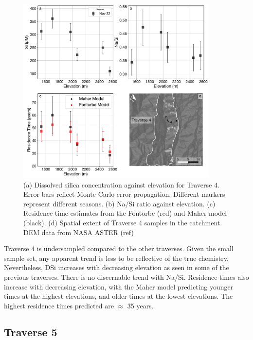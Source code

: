 \begin{figure}[h]
    \centering
        \includegraphics[width=0.9\textwidth]{Traverse_4_summary.pdf}
    \caption{(a) Dissolved silica concentration against elevation for Traverse 4. Error bars reflect Monte Carlo error propagation. Different markers represent different seasons. (b) Na/Si ratio against elevation. (c) Residence time estimates from the Fontorbe (red) and Maher model (black). (d) Spatial extent of Traverse 4 samples in the catchment. DEM data from NASA ASTER (ref)}
    \label{fig:trav4}
\end{figure}

\FloatBarrier

Traverse 4 is undersampled compared to the other traverses. Given the small sample set, any apparent trend is less to be reflective of the true chemistry. Nevertheless, DSi increases with decreasing elevation as seen in some of the previous traverses. There is no discernable trend with Na/Si. Residence times also increase with decreasing elevation, with the Maher model predicting younger times at the highest elevations, and older times at the lowest elevations. The highest residence times predicted are $\approx$ 35 years.


\subsection{Traverse 5}


